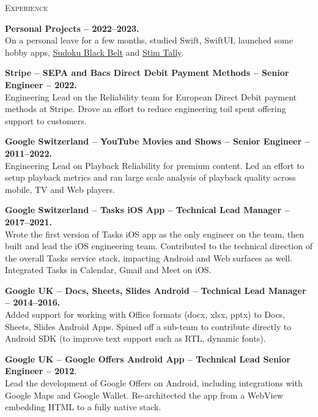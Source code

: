 \documentclass[10pt]{article}
\begin{document}
\vspace{0.16in}
\noindent
\textcolor{Primary}{{\large \textsc{Experience}}}
\begin{list}{}{\leftmargin=0em}

\item
{\bf Personal Projects -- 2022--2023.}\\
On a personal leave for a few months, studied Swift, SwiftUI, launched some hobby apps, \href{https://apps.apple.com/us/app/sudoku-black-belt/id1639802667}{Sudoku Black Belt} and 
\href{https://apps.apple.com/us/app/stim-tally/id6444342899}{Stim Tally}.

\item
{\bf Stripe -- SEPA and Bacs Direct Debit Payment Methods -- Senior Engineer -- 2022.}\\
Engineering Lead on the Reliability team for European Direct Debit payment methods at Stripe. Drove an effort to reduce engineering toil spent offering support to customers.
  
\item
{\bf Google Switzerland -- YouTube Movies and Shows -- Senior Engineer -- 2011--2022.}\\
Engineering Lead on Playback Reliability for premium content. Led an effort to setup playback metrics and ran large scale analysis of playback quality across mobile, TV and Web players.

\item
{\bf Google Switzerland -- Tasks iOS App -- Technical Lead Manager -- 2017--2021.}\\
Wrote the first version of Tasks iOS app as the only engineer on the team, then built and lead the iOS engineering team.
Contributed to the technical direction of the overall Tasks service stack, impacting Android and Web surfaces
as well. Integrated Tasks in Calendar, Gmail and Meet on iOS.
  
\item
{\bf Google UK -- Docs, Sheets, Slides Android -- Technical Lead Manager -- 2014--2016.}\\
Added support for working with Office formats (docx, xlsx, pptx) to Docs, Sheets, Slides Android Apps. Spined off a
sub-team to contribute directly to Android SDK (to improve text support such as RTL, dynamic fonts). 

\item
{\bf Google UK -- Google Offers Android App -- Technical Lead Senior Engineer -- 2012}.\\
Lead the development of Google Offers on Android, including integrations with Google Maps and Google Wallet.
Re-architected the app from a WebView embedding HTML to a fully native stack.


\end{list}
\end{document}
